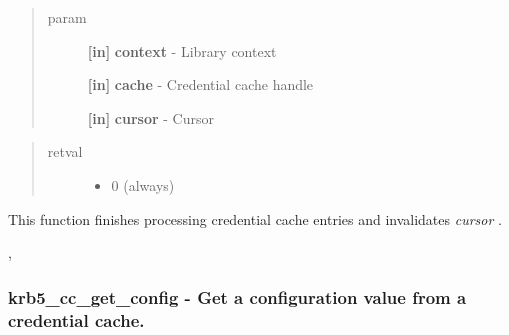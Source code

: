 \documentclass[letterpaper,10pt,english]{sphinxmanual}
\begin{document}
\begin{quote}\begin{description}
\item[{param}] \leavevmode
\textbf{{[}in{]}} \textbf{context} - Library context

\textbf{{[}in{]}} \textbf{cache} - Credential cache handle

\textbf{{[}in{]}} \textbf{cursor} - Cursor

\end{description}\end{quote}
\begin{quote}\begin{description}
\item[{retval}] \leavevmode\begin{itemize}
\item {} 
0   (always)

\end{itemize}

\end{description}\end{quote}

This function finishes processing credential cache entries and invalidates \emph{cursor} .




{\hyperref[appdev/refs/api/krb5_cc_start_seq_get:krb5_cc_start_seq_get]{}} , {\hyperref[appdev/refs/api/krb5_cc_next_cred:krb5_cc_next_cred]{}}




\subsubsection{krb5\_cc\_get\_config -  Get a configuration value from a credential cache.}
\label{appdev/refs/api/krb5_cc_get_config:krb5-cc-get-config-get-a-configuration-value-from-a-credential-cache}\label{appdev/refs/api/krb5_cc_get_config::doc}

\begin{fulllineitems}
\label{appdev/refs/api/krb5_cc_get_config:krb5_cc_get_config}
\end{fulllineitems}
\end{document}
